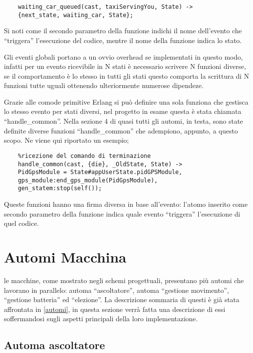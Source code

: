 \begin{lstlisting}
	waiting_car_queued(cast, taxiServingYou, State) ->
	{next_state, waiting_car, State};
\end{lstlisting}

Si noti come il secondo parametro della funzione indichi il nome dell'evento che ``triggera'' l'esecuzione del codice, mentre il nome della funzione indica lo stato.

Gli eventi globali portano a un ovvio overhead se implementati in questo modo, infatti per un evento ricevibile in N stati è necessario scrivere N funzioni diverse, se il comportamento è lo stesso in tutti gli stati questo comporta la scrittura di N funzioni tutte uguali ottenendo ulteriormente numerose dipendeze.

Grazie alle comode primitive Erlang si può definire una sola funziona che gestisca lo stesso evento per stati diversi, nel progetto in esame questa è stata chiamata ``handle\_common''. Nella sezione 4 di quasi tutti gli automi, in testa, sono state definite diverse funzioni ``handle\_common'' che adempiono, appunto, a questo scopo. Ne viene qui riportato un esempio;

\begin{lstlisting}
	%ricezione del comando di terminazione
	handle_common(cast, {die}, _OldState, State) ->
	PidGpsModule = State#appUserState.pidGPSModule,
	gps_module:end_gps_module(PidGpsModule),
	gen_statem:stop(self());
\end{lstlisting}

Queste funzioni hanno una firma diversa in base all'evento: l'atomo inserito come secondo parametro della funzione indica quale evento ``triggera'' l'esecuzione di quel codice.

\section{Automi Macchina} \label{automiMacchina}

le macchine, come mostrato negli schemi progettuali, presentano più automi che lavorano in parallelo: automa ``ascoltatore'', automa ``gestione movimento'', ``gestione batteria'' ed ``elezione''. La descrizione sommaria di questi è già stata affrontata in \ref{automi}, in questa sezione verrà fatta una descrizione di essi soffermandosi sugli aspetti principali della loro implementazione.

\subsection{Automa ascoltatore} \label{automaAscoltatore}

